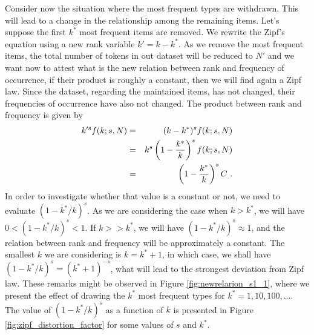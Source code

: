 Consider now the situation where the most frequent types are withdrawn. This will lead 
to a change in the relationship among the remaining items. Let's suppose the first $k^\ast$
most frequent items are removed. We rewrite the Zipf's equation using a new rank
variable $k' = k - k^\ast$. As we remove the most frequent items, the total number of
tokens in out dataset will be reduced to $N'$ and we want now to attest what is the 
new relation between rank and frequency of occurrence, if their product is roughly 
a constant, then we will find again a Zipf law. Since the dataset, regarding the
maintained items, has not changed, their frequencies of occurrence have also not changed.
The product between rank and frequency is given by
\begin{eqnarray}
k'^s f(k; s, N) &=& (k-k^\ast)^s f(k; s, N) \nonumber \\
                &=& k^s \left( 1 - \frac{k^\ast}{k} \right)^s f(k; s, N) \nonumber \\
                &=& \left( 1 - \frac{k^\ast}{k} \right)^s C \textmd{ .}
\end{eqnarray}
In order to investigate whether that value is a constant or not, we need
to evaluate $(1-k^\ast/k)^s$. As we are considering the case when $k > k^\ast$, 
we will have $0 < (1-k^\ast/k)^s < 1$.
If $k >> k^\ast$, we will have $(1-k^\ast/k)^s \approx 1$, and the relation between
rank and frequency will be approximately a constant. The smallest $k$ we are considering
is $k=k^\ast+1$, in which case, we shall have $(1-k^\ast/k)^s = (k^\ast+1)^{-s}$, 
what will lead to the strongest deviation from Zipf law. These remarks might
be observed in Figure \ref{fig:newrelarion_s1_1}, where we present the effect of
drawing the $k^\ast$ most frequent types for $k^\ast = 1,10 , 100, \ldots$. 
The value of $(1-k^\ast/k)^s$ as a function of $k$ is presented in Figure \ref{fig:zipf_distortion_factor}
for some values of $s$ and $k^\ast$.




